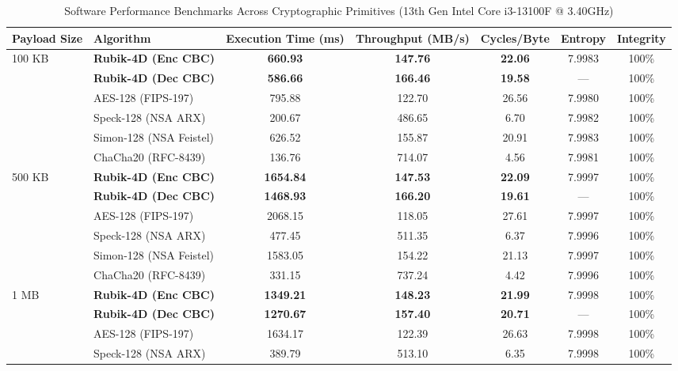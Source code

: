 \begin{table}[t]
\caption{Software Performance Benchmarks Across Cryptographic Primitives (13th Gen Intel Core i3-13100F @ 3.40GHz)}
\label{tab:software_benchmarks_updated}
\centering
\small
\begin{tabular}{@{}llccccc@{}}
\toprule
\textbf{Payload Size} & \textbf{Algorithm} & \textbf{Execution Time (ms)} & \textbf{Throughput (MB/s)} & \textbf{Cycles/Byte} & \textbf{Entropy} & \textbf{Integrity} \\ \midrule
\multirow{6}{*}{100 KB}
 & \textbf{Rubik-4D (Enc CBC)} & \textbf{660.93} & \textbf{147.76} & \textbf{22.06} & 7.9983 & 100\% \\
 & \textbf{Rubik-4D (Dec CBC)} & \textbf{586.66} & \textbf{166.46} & \textbf{19.58} & --- & 100\% \\
 & AES-128 (FIPS-197) & 795.88 & 122.70 & 26.56 & 7.9980 & 100\% \\
 & Speck-128 (NSA ARX) & 200.67 & 486.65 & 6.70 & 7.9982 & 100\% \\
 & Simon-128 (NSA Feistel) & 626.52 & 155.87 & 20.91 & 7.9983 & 100\% \\
 & ChaCha20 (RFC-8439) & 136.76 & 714.07 & 4.56 & 7.9981 & 100\% \\
\midrule
\multirow{6}{*}{500 KB}
 & \textbf{Rubik-4D (Enc CBC)} & \textbf{1654.84} & \textbf{147.53} & \textbf{22.09} & 7.9997 & 100\% \\
 & \textbf{Rubik-4D (Dec CBC)} & \textbf{1468.93} & \textbf{166.20} & \textbf{19.61} & --- & 100\% \\
 & AES-128 (FIPS-197) & 2068.15 & 118.05 & 27.61 & 7.9997 & 100\% \\
 & Speck-128 (NSA ARX) & 477.45 & 511.35 & 6.37 & 7.9996 & 100\% \\
 & Simon-128 (NSA Feistel) & 1583.05 & 154.22 & 21.13 & 7.9997 & 100\% \\
 & ChaCha20 (RFC-8439) & 331.15 & 737.24 & 4.42 & 7.9996 & 100\% \\
\midrule
\multirow{6}{*}{1 MB}
 & \textbf{Rubik-4D (Enc CBC)} & \textbf{1349.21} & \textbf{148.23} & \textbf{21.99} & 7.9998 & 100\% \\
 & \textbf{Rubik-4D (Dec CBC)} & \textbf{1270.67} & \textbf{157.40} & \textbf{20.71} & --- & 100\% \\
 & AES-128 (FIPS-197) & 1634.17 & 122.39 & 26.63 & 7.9998 & 100\% \\
 & Speck-128 (NSA ARX) & 389.79 & 513.10 & 6.35 & 7.9998 & 100\% \\

\end{tabular}
\end{table}
